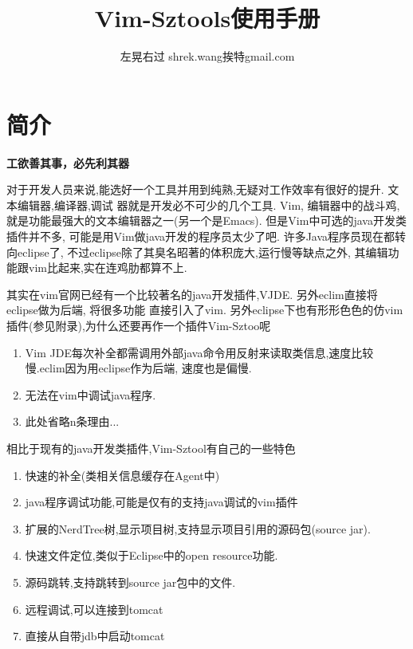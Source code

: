 \documentclass[oneside,openany]{book}
\title{Vim-Sztools使用手册}
\author{左晃右过 shrek.wang挨特gmail.com}
\begin{document}
\maketitle

\chapter{简介}

  \begin{center}
    \large\textbf{工欲善其事，必先利其器}
  \end{center}

  对于开发人员来说,能选好一个工具并用到纯熟,无疑对工作效率有很好的提升. 文本编辑器,编译器,调试
器就是开发必不可少的几个工具.  Vim, 编辑器中的战斗鸡,就是功能最强大的文本编辑器之一(另一个是Emacs). 
但是Vim中可选的java开发类插件并不多, 可能是用Vim做java开发的程序员太少了吧. 许多Java程序员现在都转向eclipse了,
不过eclipse除了其臭名昭著的体积庞大,运行慢等缺点之外, 其编辑功能跟vim比起来,实在连鸡肋都算不上. 

  其实在vim官网已经有一个比较著名的java开发插件,VJDE. 另外eclim直接将eclipse做为后端, 将很多功能
直接引入了vim. 另外eclipse下也有形形色色的仿vim插件(参见附录),为什么还要再作一个插件Vim-Sztoo呢
  
  \begin{enumerate}
    \item Vim JDE每次补全都需调用外部java命令用反射来读取类信息,速度比较慢.eclim因为用eclipse作为后端, 速度也是偏慢.
    \item 无法在vim中调试java程序.
    \item 此处省略n条理由...
  \end{enumerate}

  相比于现有的java开发类插件,Vim-Sztool有自己的一些特色
  \begin{enumerate}
    \item 快速的补全(类相关信息缓存在Agent中)
    \item java程序调试功能,可能是仅有的支持java调试的vim插件
    \item 扩展的NerdTree树,显示项目树,支持显示项目引用的源码包(source jar).
    \item 快速文件定位,类似于Eclipse中的open resource功能.
    \item 源码跳转,支持跳转到source jar包中的文件.
    \item 远程调试,可以连接到tomcat
    \item 直接从自带jdb中启动tomcat
  \end{enumerate}
\end{document}
